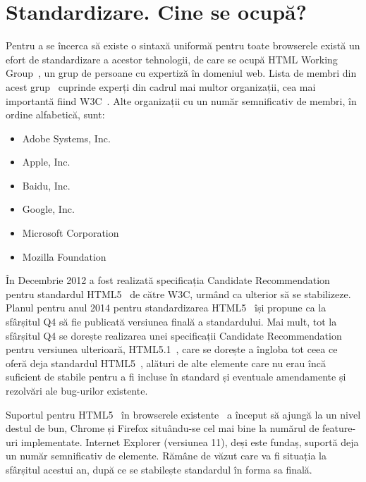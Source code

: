 \documentclass[12pt]{article} %
\begin{document}

\section{Standardizare. Cine se ocupă?} %

Pentru a se încerca să existe o sintaxă uniformă pentru toate browserele există un efort de standardizare
a acestor tehnologii, de care se ocupă HTML Working Group~\cite{website:htmlwg}, un grup de persoane cu
expertiză în domeniul web. Lista de membri din acest grup~\cite{website:htmlwgmembers} cuprinde experți
din cadrul mai multor organizații, cea mai importantă fiind W3C~\cite{website:w3c}. Alte organizații cu un
număr semnificativ de membri, în ordine alfabetică, sunt:

\begin{itemize}[nosep] %
	\item Adobe Systems, Inc.~\cite{website:adobeinc}
    \item Apple, Inc.~\cite{website:appleinc}
	\item Baidu, Inc.~\cite{website:baiduinc}
	\item Google, Inc.~\cite{website:googleinc}
	\item Microsoft Corporation~\cite{website:microsoft}
	\item Mozilla Foundation~\cite{website:mozilla}
\end{itemize}

În Decembrie 2012 a fost realizată specificația Candidate Recommendation pentru standardul
HTML5~\cite{website:html5cr} de către W3C, urmând ca ulterior să se stabilizeze. Planul pentru anul 2014
pentru standardizarea HTML5~\cite{website:html5-2014-plan} își propune ca la sfârșitul Q4 să fie
publicată versiunea finală a standardului. Mai mult, tot la sfârșitul Q4 se dorește realizarea unei
specificații Candidate Recommendation pentru versiunea ulterioară, HTML5.1~\cite{website:html5.1-milestones},
care se dorește a îngloba tot ceea ce oferă deja standardul HTML5~\cite{website:html5}, alături de alte
elemente care nu erau încă suficient de stabile pentru a fi incluse în standard și eventuale amendamente
și rezolvări ale bug-urilor existente.

Suportul pentru HTML5~\cite{website:html5} în browserele existente~\cite{website:html5-support} a început
să ajungă la un nivel destul de bun, Chrome și Firefox situându-se cel mai bine la numărul de feature-uri
implementate. Internet Explorer (versiunea 11), deși este fundaș, suportă deja un număr semnificativ de
elemente. Rămâne de văzut care va fi situația la sfârșitul acestui an, după ce se stabilește standardul în
forma sa finală.
\end{document}
